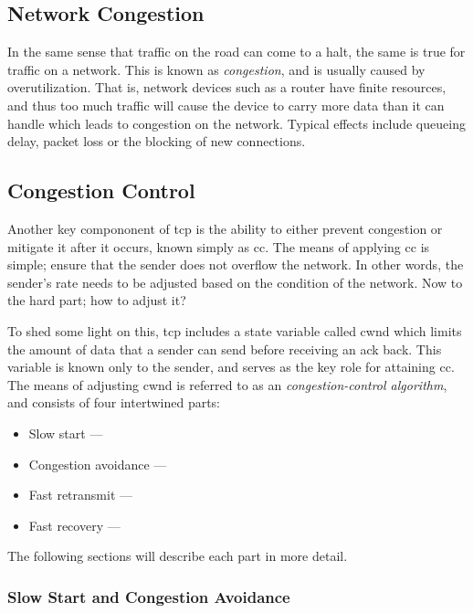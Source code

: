 \subsection{Network Congestion}

In the same sense that traffic on the road can come to a halt, the same is true for traffic on a network. This is known as \textit{congestion}, and is usually caused by overutilization. That is, network devices such as a router have finite resources, and thus too much traffic will cause the device to carry more data than it can handle which leads to congestion on the network. Typical effects include queueing delay, packet loss or the blocking of new connections.



\subsection{Congestion Control}

Another key compononent of \gls{tcp} is the ability to either prevent congestion or mitigate it after it occurs, known simply as \gls{cc}. The means of applying \gls{cc} is simple; ensure that the sender does not overflow the network. In other words, the sender's rate needs to be adjusted based on the condition of the network. Now to the hard part; how to adjust it?

To shed some light on this, \gls{tcp} includes a state variable called \gls{cwnd} which limits the amount of data that a sender can send before receiving an \gls{ack} back. This variable is known only to the sender, and serves as the key role for attaining \gls{cc}. The means of adjusting \gls{cwnd} is referred to as an \textit{congestion-control algorithm}, and consists of four intertwined parts:

\begin{itemize}
    \item Slow start ---
    \item Congestion avoidance ---
    \item Fast retransmit ---
    \item Fast recovery ---
\end{itemize}

The following sections will describe each part in more detail.

\subsubsection{Slow Start and Congestion Avoidance}

